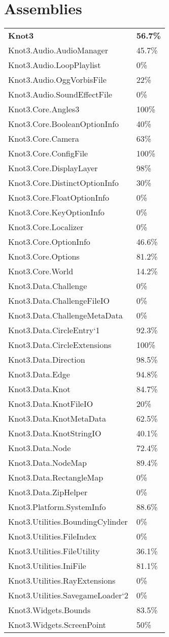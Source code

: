 \documentclass[a4paper,10pt]{article}
\begin{document}
\section{Assemblies}
\begin{longtable}[l]{ll}
\textbf{Knot3} & \textbf{56.7\%}\\
Knot3.Audio.AudioManager & 45.7\%\\
Knot3.Audio.LoopPlaylist & 0\%\\
Knot3.Audio.OggVorbisFile & 22\%\\
Knot3.Audio.SoundEffectFile & 0\%\\
Knot3.Core.Angles3 & 100\%\\
Knot3.Core.BooleanOptionInfo & 40\%\\
Knot3.Core.Camera & 63\%\\
Knot3.Core.ConfigFile & 100\%\\
Knot3.Core.DisplayLayer & 98\%\\
Knot3.Core.DistinctOptionInfo & 30\%\\
Knot3.Core.FloatOptionInfo & 0\%\\
Knot3.Core.KeyOptionInfo & 0\%\\
Knot3.Core.Localizer & 0\%\\
Knot3.Core.OptionInfo & 46.6\%\\
Knot3.Core.Options & 81.2\%\\
Knot3.Core.World & 14.2\%\\
Knot3.Data.Challenge & 0\%\\
Knot3.Data.ChallengeFileIO & 0\%\\
Knot3.Data.ChallengeMetaData & 0\%\\
Knot3.Data.CircleEntry`1 & 92.3\%\\
Knot3.Data.CircleExtensions & 100\%\\
Knot3.Data.Direction & 98.5\%\\
Knot3.Data.Edge & 94.8\%\\
Knot3.Data.Knot & 84.7\%\\
Knot3.Data.KnotFileIO & 20\%\\
Knot3.Data.KnotMetaData & 62.5\%\\
Knot3.Data.KnotStringIO & 40.1\%\\
Knot3.Data.Node & 72.4\%\\
Knot3.Data.NodeMap & 89.4\%\\
Knot3.Data.RectangleMap & 0\%\\
Knot3.Data.ZipHelper & 0\%\\
Knot3.Platform.SystemInfo & 88.6\%\\
Knot3.Utilities.BoundingCylinder & 0\%\\
Knot3.Utilities.FileIndex & 0\%\\
Knot3.Utilities.FileUtility & 36.1\%\\
Knot3.Utilities.IniFile & 81.1\%\\
Knot3.Utilities.RayExtensions & 0\%\\
Knot3.Utilities.SavegameLoader`2 & 0\%\\
Knot3.Widgets.Bounds & 83.5\%\\
Knot3.Widgets.ScreenPoint & 50\%\\
\end{longtable}
\end{document}
